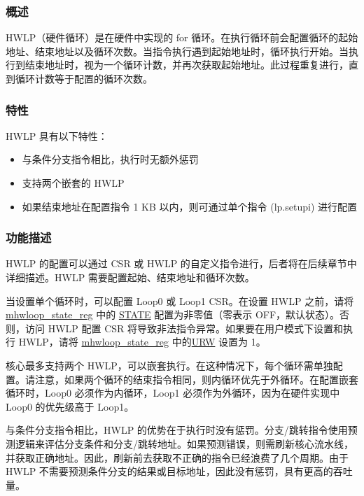 \documentclass[main\_\_CN.tex]{subfiles}
\begin{document}
\subsubsection{概述}
\label{sec:riscvcpu-hwloop-overview}

HWLP（硬件循环）是在硬件中实现的 for 循环。在执行循环前会配置循环的起始地址、结束地址以及循环次数。当指令执行遇到起始地址时，循环执行开始。当执行到结束地址时，视为一个循环计数，并再次获取起始地址。此过程重复进行，直到循环计数等于配置的循环次数。

\subsubsection{特性}
\label{sec:riscvcpu-hwloop-feature}

HWLP 具有以下特性：

\begin{itemize}
\item 与条件分支指令相比，执行时无额外惩罚
\item 支持两个嵌套的 HWLP
\item 如果结束地址在配置指令 1 KB 以内，则可通过单个指令 (lp.setupi) 进行配置
\end{itemize}

\subsubsection{功能描述}
\label{sec:riscvcpu-hwloop-func-descr}

HWLP 的配置可以通过 CSR 或 HWLP 的自定义指令进行，后者将在后续章节中详细描述。HWLP 需要配置起始、结束地址和循环次数。

当设置单个循环时，可以配置 Loop0 或 Loop1 CSR。在设置 HWLP 之前，请将 \hyperref[sec:riscvcpu-hwloop-reg-desc]{mhwloop\_state\_reg}  中的 \hyperref[regdesc:mhwlp_state_reg]{STATE} 配置为非零值（零表示 OFF，默认状态）。否则，访问 HWLP 配置 CSR 将导致非法指令异常。如果要在用户模式下设置和执行 HWLP，请将 \hyperref[sec:riscvcpu-hwloop-reg-desc]{mhwloop\_state\_reg} 中的\hyperref[regdesc:mhwlp_state_reg]{URW} 设置为 1。

核心最多支持两个 HWLP，可以嵌套执行。在这种情况下，每个循环需单独配置。请注意，如果两个循环的结束指令相同，则内循环优先于外循环。在配置嵌套循环时，Loop0 必须作为内循环，Loop1 必须作为外循环，因为在硬件实现中 Loop0 的优先级高于 Loop1。

与条件分支指令相比，HWLP 的优势在于执行时没有惩罚。分支/跳转指令使用预测逻辑来评估分支条件和分支/跳转地址。如果预测错误，则需刷新核心流水线，并获取正确地址。因此，刷新前去获取不正确的指令已经浪费了几个周期。由于 HWLP 不需要预测条件分支的结果或目标地址，因此没有惩罚，具有更高的吞吐量。
\end{document}
